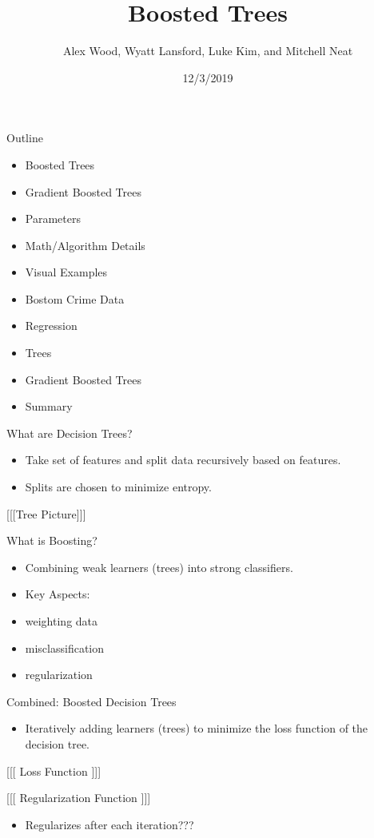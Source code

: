 \documentclass[ignorenonframetext,]{beamer}
\title{Boosted Trees}
\author{Alex Wood, Wyatt Lansford, Luke Kim, and Mitchell Neat}
\date{12/3/2019}
\providecommand{\tightlist}{%
  \setlength{\itemsep}{0pt}\setlength{\parskip}{0pt}}
\begin{document}
\frame{\titlepage}

\begin{frame}{Outline}

\begin{itemize}
\item
  Boosted Trees
\item
  Gradient Boosted Trees
\item
  Parameters
\item
  Math/Algorithm Details
\item
  Visual Examples
\item
  Bostom Crime Data
\item
  Regression
\item
  Trees
\item
  Gradient Boosted Trees
\item
  Summary
\end{itemize}

\end{frame}

\begin{frame}{What are Decision Trees?}

\begin{itemize}
\item
  Take set of features and split data recursively based on features.
\item
  Splits are chosen to minimize entropy.
\end{itemize}

{[}{[}{[}Tree Picture{]}{]}{]}

\end{frame}

\begin{frame}{What is Boosting?}

\begin{itemize}
\item
  Combining weak learners (trees) into strong classifiers.
\item
  Key Aspects:
\item
  weighting data
\item
  misclassification
\item
  regularization
\end{itemize}

\end{frame}

\begin{frame}{Combined: Boosted Decision Trees}

\begin{itemize}
\tightlist
\item
  Iteratively adding learners (trees) to minimize the loss function of
  the decision tree.
\end{itemize}

{[}{[}{[} Loss Function {]}{]}{]}

{[}{[}{[} Regularization Function {]}{]}{]}

\begin{itemize}
\tightlist
\item
  Regularizes after each iteration???
\end{itemize}

\end{frame}
\end{document}
